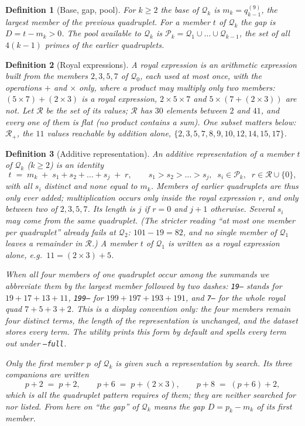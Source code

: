 \documentclass[11pt,a4paper]{article}
\newtheorem{definition}{Definition}
\newcommand{\Q}{\mathcal{Q}}
\newcommand{\Pool}{\mathcal{P}}
\newcommand{\R}{\mathcal{R}}
\newcommand{\Radd}{\mathcal{R}_{+}}
\newcommand{\code}[1]{\texttt{#1}}
\begin{document}
\begin{definition}[Base, gap, pool]
For $k\ge 2$ the \emph{base} of $\Q_k$ is $m_k=q_{k-1}^{(9)}$, the largest
member of the previous quadruplet. For a member $t$ of $\Q_k$ the
\emph{gap} is $D=t-m_k>0$. The \emph{pool} available to $\Q_k$ is
$\Pool_k=\Q_1\cup\dots\cup\Q_{k-1}$, the set of all $4(k-1)$ primes of the
earlier quadruplets.
\end{definition}

\begin{definition}[Royal expressions]
A \emph{royal expression} is an arithmetic expression built from the
members $2,3,5,7$ of $\Q_0$, each used at most once, with the operations
$+$ and $\times$ only, where a product may multiply only \emph{two} members:
$(5\times7)+(2\times3)$ is a royal expression, $2\times5\times7$ and
$5\times(7+(2\times3))$ are not. Let $\R$ be the set of its values; $\R$
has $30$ elements between $2$ and $41$, and every one of them is
\emph{flat} (no product contains a sum). One subset matters below:
$\Radd$, the $11$ values reachable by addition alone,
$\{2,3,5,7,8,9,10,12,14,15,17\}$.
\end{definition}

\begin{definition}[Additive representation]
An \emph{additive representation} of a member $t$ of $\Q_k$ ($k\ge2$) is an
identity
\[
t \;=\; m_k \;+\; s_1+s_2+\dots+s_j \;+\; r,
\qquad s_1>s_2>\dots>s_j,\;\; s_i\in\Pool_k,\;\; r\in\R\cup\{0\},
\]
with all $s_i$ distinct and none equal to $m_k$. Members of earlier
quadruplets are thus only ever added; multiplication occurs only inside the
royal expression $r$, and only between two of $2,3,5,7$. Its \emph{length} is
$j$ if $r=0$ and $j+1$ otherwise. Several $s_i$ may come from the same
quadruplet. (The stricter reading ``at most one member per quadruplet''
already fails at $\Q_2$: $101-19=82$, and no single member of $\Q_1$ leaves
a remainder in $\R$.) A member $t$ of $\Q_1$ is written as a royal
expression alone, e.g.\ $11=(2\times3)+5$.

When all four members of one quadruplet occur among the summands we
abbreviate them by the largest member followed by two dashes: \code{19--}
stands for $19+17+13+11$, \code{199--} for $199+197+193+191$, and
\code{7--} for the whole royal quad $7+5+3+2$. This is a display convention
only: the four members remain four distinct terms, the length of the
representation is unchanged, and the dataset stores every term. The utility
prints this form by default and spells every term out under \code{--full}.

Only the first member $p$ of $\Q_k$ is given such a representation by
search. Its three companions are written
\[
p+2 \;=\; p+2, \qquad p+6 \;=\; p+(2\times3), \qquad p+8 \;=\; (p+6)+2,
\]
which is all the quadruplet pattern requires of them; they are neither
searched for nor listed. From here on ``the gap'' of $\Q_k$ means the gap
$D=p_k-m_k$ of its first member.
\end{definition}
\end{document}

